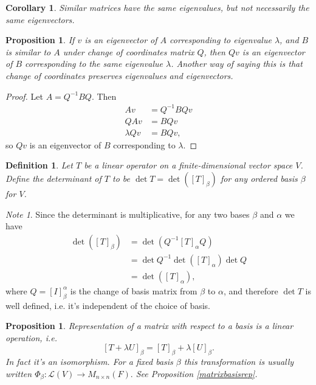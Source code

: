 \documentclass[12pt]{article}
\theoremstyle{plain}
\newtheorem{corollary}[theorem]{Corollary}
\newtheorem{proposition}[theorem]{Proposition}
\newtheorem{definition}[theorem]{Definition}
\theoremstyle{definition}
\theoremstyle{remark}
\newtheorem{note}[theorem]{Note}
\begin{document}
\begin{corollary}
Similar matrices have the same eigenvalues, but not necessarily the same eigenvectors.
\end{corollary}

\begin{proposition}
If $v$ is an eigenvector of $A$ corresponding to eigenvalue $\lambda$, and $B$ is similar to $A$ under change of coordinates matrix $Q$, then $Qv$ is an eigenvector of $B$ corresponding to the same eigenvalue $\lambda$.  Another way of saying this is that change of coordinates preserves eigenvalues and eigenvectors.
\end{proposition}

\begin{proof}
Let $A = Q^{-1}BQ$. Then
\begin{align*}
Av &= Q^{-1}BQv \\
QAv &= BQv \\
\lambda Qv &= BQv,
\end{align*}
so $Qv$ is an eigenvector of $B$ corresponding to $\lambda$.
\end{proof}

\begin{definition}\label{determinantofoperator}
Let $T$ be a linear operator on a finite-dimensional vector space $V$. Define the determinant of $T$ to be $\det T = \det([T]_\beta)$ for any ordered basis $\beta$ for $V$.
\end{definition}

\begin{note}
Since the determinant is multiplicative, for any two bases $\beta$ and $\alpha$ we have
\begin{align*}
\det([T]_\beta) &= \det(Q^{-1} [T]_\alpha Q) \\
&= \det Q^{-1} \det([T]_\alpha) \det Q \\
&= \det([T]_\alpha),
\end{align*}
where $Q = [I]^\alpha_\beta$ is the change of basis matrix from $\beta$ to $\alpha$, and therefore $\det T$ is well defined, i.e. it's independent of the choice of basis.
\end{note}

\begin{proposition}\label{changeofbasislinear}
Representation of a matrix with respect to a basis is a linear operation, i.e. $$[T + \lambda U]_\beta = [T]_\beta + \lambda[U]_\beta.$$ In fact it's an isomorphism. For a fixed basis $\beta$ this transformation is usually written $\Phi_\beta: \mathcal{L}(V) \longrightarrow M_{n\times n}(F).$ See Proposition \ref{matrixbasisrep}.
\end{proposition}
\end{document}
